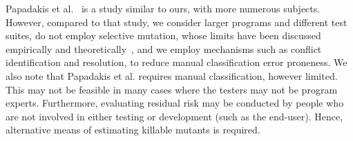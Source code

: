 \documentclass[sigconf,review,anonymous]{acmart}
\begin{document}
Papadakis et al.~\cite{papadakis2014mitigating} is a study similar to ours,
with more numerous subjects. However, compared to that study,
we consider larger programs and different test suites, do not employ selective mutation, whose limits have been discussed empirically and theoretically~\cite{gopinath2017mutation,gopinath2016on}, and we employ mechanisms such as conflict identification and resolution, to reduce manual classification error proneness. %
We also note that Papadakis et al. requires manual classification, however limited. This may not be feasible in many cases where the testers may not be
program experts. Furthermore, evaluating residual risk may be conducted by
people who are not involved in either testing or development (such as the end-user). Hence, alternative means of estimating killable mutants is required.

%
%

\end{document}
